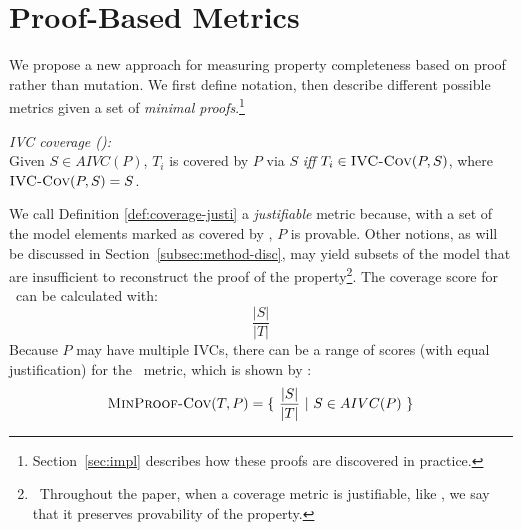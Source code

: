 \newcommand{\minproofcov}{\text{\sc MinProof-Cov}}


\section{Proof-Based Metrics}
\label{sec:method}

We propose a new approach for measuring property completeness based on proof rather than mutation.  We first define notation, then describe different possible metrics given a set of {\em minimal proofs}.\footnote{Section~\ref{sec:impl} describes how these proofs are discovered in practice.}

\begin{definition} {\emph{IVC coverage (\ivccov):}} \\
\label{def:coverage-justi}
Given $S \in AIVC(P)$, $T_i$ is covered by $P$ via $S$ \emph{iff} $T_i \in \text{\sc IVC-Cov} (P, S)$, where
$\text{\sc IVC-Cov} (P, S) = S$.
\end{definition}
\vspace{2mm}

%
We call Definition \ref{def:coverage-justi} a \emph{justifiable} metric because, with a set of the model elements marked as covered by \ivccov, $P$ is provable.  Other notions, as will be discussed in Section~\ref{subsec:method-disc}, may yield subsets of the model that are insufficient to reconstruct the proof of the property\footnote{\noindent ~Throughout the paper, when a coverage metric is justifiable, like \ivccov, we say that it preserves provability of the property.}.
The coverage score for \ivccov\ can be calculated with: $$\frac{|S|}{|T|}$$
Because $P$ may have multiple IVCs, there can be a range of scores (with equal justification) for the \ivccov\ metric, which is shown by \minproofcov:
\[
   \minproofcov(T, P) = \{~\frac{ |S|}{|T|}~|~S \in AIVC(P)~\}
\]

